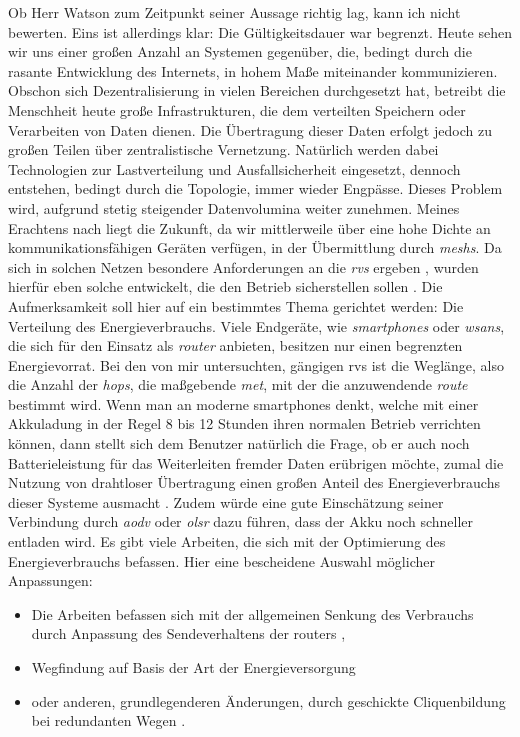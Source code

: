 Ob Herr Watson zum Zeitpunkt seiner Aussage richtig lag, kann ich nicht bewerten. Eins ist allerdings klar: Die Gültigkeitsdauer war begrenzt. Heute sehen wir uns einer großen Anzahl an Systemen gegenüber, die, bedingt durch die rasante Entwicklung des Internets, in hohem Maße miteinander kommunizieren. Obschon sich Dezentralisierung in vielen Bereichen durchgesetzt hat, betreibt die Menschheit heute große Infrastrukturen, die dem verteilten Speichern oder Verarbeiten von Daten dienen. Die Übertragung dieser Daten erfolgt jedoch zu großen Teilen über zentralistische Vernetzung. Natürlich werden dabei Technologien zur Lastverteilung und Ausfallsicherheit eingesetzt, dennoch entstehen, bedingt durch die Topologie, immer wieder Engpässe. Dieses Problem wird, aufgrund stetig steigender Datenvolumina weiter zunehmen. Meines Erachtens nach liegt die Zukunft, da wir mittlerweile über eine hohe Dichte an kommunikationsfähigen Geräten verfügen, in der Übermittlung durch \textit{\glspl{mesh}}. Da sich in solchen Netzen besondere Anforderungen an die \textit{\glspl{rv}} ergeben \cite{RFC2501}, wurden hierfür eben solche entwickelt, die den Betrieb sicherstellen sollen \cite{Azzedine11} \cite{Kumar13}. Die Aufmerksamkeit soll hier auf ein bestimmtes Thema gerichtet werden: Die Verteilung des Energieverbrauchs. Viele Endgeräte, wie \textit{\glspl{smartphone}} oder \textit{\glspl{wsan}}, die sich für den Einsatz als \textit{\gls{router}} anbieten, besitzen nur einen begrenzten Energievorrat. Bei den von mir untersuchten, gängigen \glspl{rv} ist die Weglänge, also die Anzahl der \textit{\glspl{hop}}, die maßgebende \textit{\gls{met}}, mit der die anzuwendende \textit{\gls{route}} bestimmt wird. Wenn man an moderne \glspl{smartphone} denkt, welche mit einer Akkuladung in der Regel 8 bis 12 Stunden ihren normalen Betrieb verrichten können, dann stellt sich dem Benutzer natürlich die Frage, ob er auch noch Batterieleistung für das Weiterleiten fremder Daten erübrigen möchte, zumal die Nutzung von drahtloser Übertragung einen großen Anteil des Energieverbrauchs dieser Systeme ausmacht \cite{Tawalbeh16}\cite{Caroll10}\cite{Huang12}. Zudem würde eine gute Einschätzung seiner Verbindung durch \textit{\gls{aodv}} oder \textit{\gls{olsr}} dazu führen, dass der Akku noch schneller entladen wird. Es gibt viele Arbeiten, die sich mit der Optimierung des Energieverbrauchs befassen. Hier eine bescheidene Auswahl möglicher Anpassungen:

\begin{itemize}
\item Die Arbeiten befassen sich mit der allgemeinen Senkung des Verbrauchs durch Anpassung des Sendeverhaltens der \glspl{router} \cite{Booranawong13} \cite{Singh88},
\item Wegfindung auf Basis der Art der Energieversorgung \cite{Avudainayagam03}
\item oder anderen, grundlegenderen Änderungen, \zB durch geschickte Cliquenbildung bei redundanten Wegen \cite{Liu09}.
\end{itemize}

